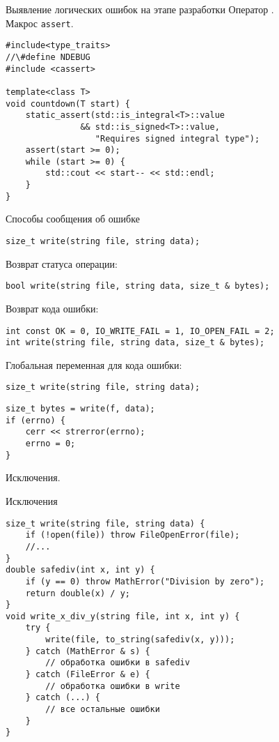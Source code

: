 \documentclass[aspectration=1610,t]{beamer}
\begin{document}
\begin{frame}[fragile]{Выявление логических ошибок на этапе разработки}
    \fakeitem Оператор .\\
    \fakeitem Макрос \texttt{assert}.
    \begin{lstlisting}
#include<type_traits>
//\#define NDEBUG
#include <cassert>

template<class T> 
void countdown(T start) {
    static_assert(std::is_integral<T>::value
               && std::is_signed<T>::value, 
                  "Requires signed integral type");
    assert(start >= 0);
    while (start >= 0) {
        std::cout << start-- << std::endl;
    }
}
    \end{lstlisting}
\end{frame}

\begin{frame}[fragile]{Способы сообщения об ошибке}
    \begin{lstlisting}
size_t write(string file, string data);
    \end{lstlisting}

        \pause\fakeitem Возврат статуса операции:
    \begin{lstlisting}
bool write(string file, string data, size_t & bytes);
    \end{lstlisting}

        \pause\fakeitem Возврат кода ошибки:
    \begin{lstlisting}
int const OK = 0, IO_WRITE_FAIL = 1, IO_OPEN_FAIL = 2;
int write(string file, string data, size_t & bytes);
    \end{lstlisting}

        \pause\fakeitem Глобальная переменная для кода ошибки:
    \begin{lstlisting}
size_t write(string file, string data);
    \end{lstlisting}

    \begin{lstlisting}
size_t bytes = write(f, data);
if (errno) {
    cerr << strerror(errno);
    errno = 0;
}
\end{lstlisting}
\pause\fakeitem Исключения.
\end{frame}

\begin{frame}[fragile]{Исключения}
\begin{lstlisting}
size_t write(string file, string data) {
    if (!open(file)) throw FileOpenError(file);
    //...
}
double safediv(int x, int y) {
    if (y == 0) throw MathError("Division by zero");
    return double(x) / y;
}
void write_x_div_y(string file, int x, int y) {
    try { 
        write(file, to_string(safediv(x, y)));
    } catch (MathError & s) { 
        // обработка ошибки в safediv
    } catch (FileError & e) { 
        // обработка ошибки в write
    } catch (...) { 
        // все остальные ошибки
    }
}
\end{lstlisting}
\end{frame}
\end{document}
